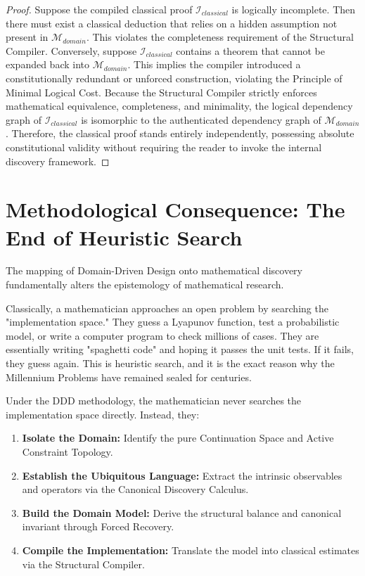 \documentclass[12pt,openany]{extbook}
\theoremstyle{plain}
\theoremstyle{definition}
\begin{document}
\begin{proof}
Suppose the compiled classical proof $\mathcal{I}_{classical}$ is logically incomplete. Then there must exist a classical deduction that relies on a hidden assumption not present in $\mathcal{M}_{domain}$. This violates the completeness requirement of the Structural Compiler. Conversely, suppose $\mathcal{I}_{classical}$ contains a theorem that cannot be expanded back into $\mathcal{M}_{domain}$. This implies the compiler introduced a constitutionally redundant or unforced construction, violating the Principle of Minimal Logical Cost. Because the Structural Compiler strictly enforces mathematical equivalence, completeness, and minimality, the logical dependency graph of $\mathcal{I}_{classical}$ is isomorphic to the authenticated dependency graph of $\mathcal{M}_{domain}$. Therefore, the classical proof stands entirely independently, possessing absolute constitutional validity without requiring the reader to invoke the internal discovery framework.
\end{proof}

\section{Methodological Consequence: The End of Heuristic Search}

The mapping of Domain-Driven Design onto mathematical discovery fundamentally alters the epistemology of mathematical research.

Classically, a mathematician approaches an open problem by searching the "implementation space." They guess a Lyapunov function, test a probabilistic model, or write a computer program to check millions of cases. They are essentially writing "spaghetti code" and hoping it passes the unit tests. If it fails, they guess again. This is heuristic search, and it is the exact reason why the Millennium Problems have remained sealed for centuries.

Under the DDD methodology, the mathematician never searches the implementation space directly. Instead, they:
\begin{enumerate}
    \item \textbf{Isolate the Domain:} Identify the pure Continuation Space and Active Constraint Topology.
    \item \textbf{Establish the Ubiquitous Language:} Extract the intrinsic observables and operators via the Canonical Discovery Calculus.
    \item \textbf{Build the Domain Model:} Derive the structural balance and canonical invariant through Forced Recovery.
    \item \textbf{Compile the Implementation:} Translate the model into classical estimates via the Structural Compiler.
\end{enumerate}
\end{document}
